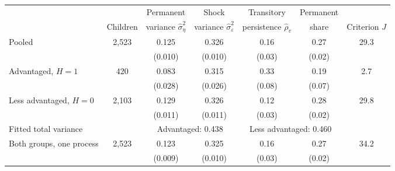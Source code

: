 \setlength{\tabcolsep}{4pt}
\begin{tabular}{@{}lcccccc@{}}
\toprule
& & Permanent & Shock & Transitory & Permanent & \\
& Children & variance $\hat\sigma^2_\eta$ & variance $\hat\sigma^2_\varepsilon$ & persistence $\hat\rho_v$ & share & Criterion $J$ \\
\midrule
Pooled & 2,523 & 0.125 & 0.326 & 0.16 & 0.27 & 29.3 \\
 &  & (0.010) & (0.010) & (0.03) & (0.02) &  \\
Advantaged, $H=1$ & 420 & 0.083 & 0.315 & 0.33 & 0.19 & 2.7 \\
 &  & (0.028) & (0.026) & (0.08) & (0.07) &  \\
Less advantaged, $H=0$ & 2,103 & 0.129 & 0.326 & 0.12 & 0.28 & 29.8 \\
 &  & (0.011) & (0.011) & (0.03) & (0.02) &  \\
\addlinespace
Fitted total variance &  & \multicolumn{2}{c}{Advantaged: 0.438} & \multicolumn{2}{c}{Less advantaged: 0.460} &  \\
\addlinespace
Both groups, one process & 2,523 & 0.123 & 0.325 & 0.16 & 0.27 & 34.2 \\
 &  & (0.009) & (0.010) & (0.03) & (0.02) &  \\
\bottomrule
\end{tabular}
